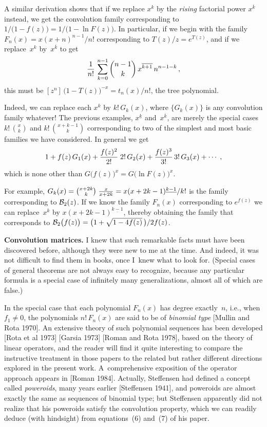 A similar derivation shows that if we replace $x^k$ by the {\it
rising\/} factorial power
$x^{\overline{k}}$
instead, we get the convolution family corresponding to
$1/\bigl(1-f(z)\bigr)=1/\bigl(1-\ln F(z)\bigr)$. 
In particular, if we begin with the family $F_n(x)=x(x+n)^{n-1}\!/n!$
corresponding to $T(z)/z=e^{T(z)}$, and if we replace~$x^k$
by~$x^{\overline{k}}$ to get
$${1\over n!}\,\sum_{k=0}^{n-1}{n-1\choose k}\,x^{\overline{k+1}}\,
n^{n-1-k}\,,$$
this must be $[z^n]\,\bigl(1-T(z)\bigr)^{-x}=t_n(x)/n!$, the tree
polynomial. 

Indeed, we can replace each $x^k$ by $k!\,G_k(x)$, where $\{G_k(x)\}$
is any convolution family whatever!  The previous examples,
$x^{\underline{k}}$ and~$x^{\overline{k}}$, are merely the special
cases $k!\,{x\choose k}$ and $k!\,{x+k-1\choose k}$ corresponding to
two of the simplest and most basic families we have considered. In
general we get
$$1+f(z)\,G_1(x)+{f(z)^2\over 2!}\;2!\,G_2(x)+{f(z)^3\over
3!}\,3!\,G_3(x)+\cdots\;,$$ 
which is none other than $G\bigl(f(z)\bigr)^x=G\bigl(\ln
F(z)\bigr)^x$. 

For example, $G_k(x)={x+2k\choose k}\;{x\over
x+2k}=x(x+2k-1)^{\underline{k-1}}/k!$ is the family corresponding to
${\cal B}_2(z)$. If we know the family $F_n(x)$ corresponding to
$e^{f(z)}$ we can replace~$x^k$ by $x(x+2k-1)^{\underline{k-1}}$,
thereby obtaining the family that corresponds to
${\cal B}_2\bigl(f(z)\bigr)=\bigl(1+\sqrt{1-4f(z)}\,\bigr)/2f(z)$.

\bn
{\bf Convolution matrices.}\enspace
I knew that such remarkable facts must have been discovered before,
although they were new to me at the time. And indeed, it was not
difficult to find them in books, once I~knew what to look for.
(Special cases of general theorems are not always easy to recognize,
because any particular formula is a special case of infinitely many
generalizations, almost all of which are false.)

In the special case that each polynomial $F_n(x)$ has degree
exactly~$n$, i.e., when $f_1\neq 0$, the polynomials $n!\,F_n(x)$ are
said to be of {\it binomial type\/}
[Mullin and Rota 1970].
An extensive theory of such polynomial sequences has been developed 
[Rota et al 1973] [Garsia 1973] [Roman and Rota 1978],
based on the theory of linear operators, and the reader will find it
quite interesting to compare the instructive treatment in those papers
to the related but rather different directions explored in the present
work. A~comprehensive exposition of the operator approach appears in
[Roman 1984]. Actually, Steffensen had defined a concept called {\it
poweroids}, many years earlier [Steffensen 1941], and poweroids are
almost exactly the same as sequences of binomial type; but Steffensen
apparently did not realize that his poweroids satisfy the convolution
property, which we can readily deduce (with hindsight) from
equations~(6) and~(7) of his paper.

